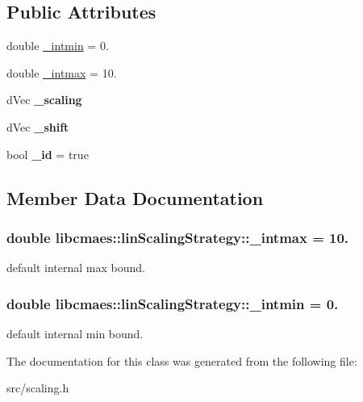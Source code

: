 \subsection*{Public Attributes}
\begin{DoxyCompactItemize}
\item 
double \hyperlink{classlibcmaes_1_1linScalingStrategy_ab5cf302d085ee302ed180a4c29c25bf2}{\-\_\-intmin} = 0.
\item 
double \hyperlink{classlibcmaes_1_1linScalingStrategy_a8d25d3fd0d901c010e925cf786b78d04}{\-\_\-intmax} = 10.
\item 
\hypertarget{classlibcmaes_1_1linScalingStrategy_a483cfaf8bceb634977c9cfd4683766b5}{d\-Vec {\bfseries \-\_\-scaling}}\label{classlibcmaes_1_1linScalingStrategy_a483cfaf8bceb634977c9cfd4683766b5}

\item 
\hypertarget{classlibcmaes_1_1linScalingStrategy_a42023d6a68d1efecb1d8ec3bc6261a9b}{d\-Vec {\bfseries \-\_\-shift}}\label{classlibcmaes_1_1linScalingStrategy_a42023d6a68d1efecb1d8ec3bc6261a9b}

\item 
\hypertarget{classlibcmaes_1_1linScalingStrategy_a61536bec2c52d4649663bb76e82af1b9}{bool {\bfseries \-\_\-id} = true}\label{classlibcmaes_1_1linScalingStrategy_a61536bec2c52d4649663bb76e82af1b9}

\end{DoxyCompactItemize}


\subsection{Member Data Documentation}
\hypertarget{classlibcmaes_1_1linScalingStrategy_a8d25d3fd0d901c010e925cf786b78d04}{
\subsubsection[{\-\_\-intmax}]{\setlength{\rightskip}{0pt plus 5cm}double libcmaes\-::lin\-Scaling\-Strategy\-::\-\_\-intmax = 10.}}\label{classlibcmaes_1_1linScalingStrategy_a8d25d3fd0d901c010e925cf786b78d04}
default internal max bound. \hypertarget{classlibcmaes_1_1linScalingStrategy_ab5cf302d085ee302ed180a4c29c25bf2}{
\subsubsection[{\-\_\-intmin}]{\setlength{\rightskip}{0pt plus 5cm}double libcmaes\-::lin\-Scaling\-Strategy\-::\-\_\-intmin = 0.}}\label{classlibcmaes_1_1linScalingStrategy_ab5cf302d085ee302ed180a4c29c25bf2}
default internal min bound. 

The documentation for this class was generated from the following file\-:\begin{DoxyCompactItemize}
\item 
src/scaling.\-h\end{DoxyCompactItemize}
